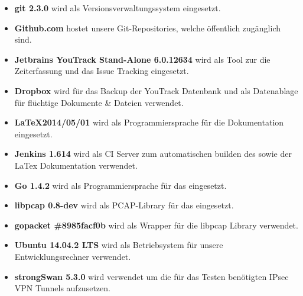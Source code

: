 \begin{itemize}
  \item \textbf{git 2.3.0} \newline wird als Versionsverwaltungssystem eingesetzt.
  \item \textbf{Github.com} \newline hostet unsere Git-Repositories, welche öffentlich zugänglich sind.
  \item \textbf{Jetbrains YouTrack Stand-Alone 6.0.12634} \newline wird als Tool zur die Zeiterfassung und das Issue Tracking eingesetzt.
  \item \textbf{Dropbox} \newline wird für das Backup der YouTrack Datenbank und als Datenablage für flüchtige Dokumente \& Dateien verwendet.
  \item \textbf{\LaTeX  2014/05/01} \newline wird als Programmiersprache für die Dokumentation eingesetzt.
  \item \textbf{Jenkins 1.614} \newline wird als \acl{CI} Server zum automatischen builden des \tool{} sowie der LaTex Dokumentation verwendet.
  \item \textbf{Go 1.4.2} \newline wird als Programmiersprache für das \tool eingesetzt.
  \item \textbf{libpcap 0.8-dev} \newline wird als \acs{PCAP}-Library für das \tool eingesetzt.
  \item \textbf{gopacket \#8985facf0b} \newline wird als Wrapper für die libpcap Library verwendet.
  \item \textbf{Ubuntu 14.04.2 LTS} \newline wird als Betriebsystem für unsere Entwicklungsrechner verwendet.
  \item \textbf{strongSwan 5.3.0} \newline wird verwendet um die für das Testen benötigten \acs{IPsec} \acs{VPN} Tunnels aufzusetzen.
\end{itemize}